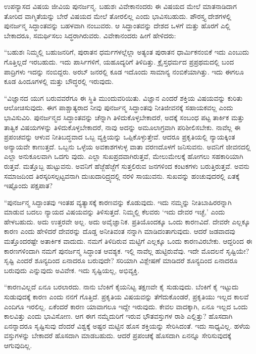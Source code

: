ಉಪನ್ಯಾಸದ ವಿಷಯ ಜೀವಿಯ ಪುನರ್ಜನ್ಮ. ಬಹುಶಃ ವಿವೇಕಾನಂದರು ಈ ವಿಷಯದ ಮೇಲೆ ಮಾತನಾಡಿದಾಗ ತೋರಿದ ವಾಗ್ಮಿತೆಯನ್ನು ಬೇರೆ ವಿಷಯದ ಮೇಲೆ ತೋರಲಿಲ್ಲ ಎಂದು ಭಾವಿಸಬಹುದು. ಪೌರಸ್ತ್ಯ ದೇಶಗಳಲ್ಲಿ ಪುನರ್ಜನ್ಮ ಸಿದ್ಧಾಂತವನ್ನು ಬಹಳವಾಗಿ ನಂಬುವರು. ಆ ಸಿದ್ಧಾಂತವನ್ನು ದೇಶದ ಒಳಗೆ ಮತ್ತು ಹೊರಗೆ ಎಲ್ಲಿ ಬೇಕಾದರೂ, ಸಮರ್ಥಿಸಲು ಸಿದ್ಧರಾಗಿರುವರು. ವಿವೇಕಾನಂದರು ಹೀಗೆ ಹೇಳಿದರು:

“ಬಹುಶಃ ನಿಮ್ಮಲ್ಲಿ ಬಹುಜನರಿಗೆ, ಪುರಾತನ ಧರ್ಮಗಳಲ್ಲೆಲ್ಲಾ ಅತ್ಯಂತ ಪುರಾತನ ಧಾರ್ಮಿಕನಂಬಿಕೆ ಇದು ಎಂಬುದು ಗೊತ್ತಿಲ್ಲದೆ ಇರಬಹುದು. ಇದು ಪಾರ್ಸಿಗಳಿಗೆ, ಯಹೂದ್ಯರಿಗೆ ತಿಳಿದಿತ್ತು. ಕ್ರೈಸ್ತಧರ್ಮದ ಪ್ರಪ್ರಥಮದಲ್ಲಿ ಬಂದ ಪಾದ್ರಿಗಳು ಇದನ್ನು ನಂಬಿದ್ದರು. ಅರಬ್​ ಜನರಲ್ಲಿ ಕೂಡ ಇದೊಂದು ಸಾಮಾನ್ಯ ನಂಬಿಕೆಯಾಗಿತ್ತು. ಇದು ಈಗಲೂ ಕೂಡ ಹಿಂದೂಗಳಲ್ಲಿ ಮತ್ತು ಬೌದ್ಧರಲ್ಲಿ ಇರುವುದು.

“ವಿಜ್ಞಾನದ ಯುಗ ಬರುವವರೆಗೂ ಈ ಸ್ಥಿತಿ ಮುಂದುವರಿಯಿತು. ವಿಜ್ಞಾನ ಎಂದರೆ ಶಕ್ತಿಯ ವಿಷಯವನ್ನು ಕುರಿತು ಆಲೋಚಿಸುವುದು. ಈಗ ಪಾಶ್ಚಾತ್ಯರಾದ ನೀವು ಪುನರ್ಜನ್ಮ ಸಿದ್ಧಾಂತವು ನೀತಿಜೀವನಕ್ಕೆ ಸಹಾಯಕವಲ್ಲ ಎಂದು ಭಾವಿಸುವಿರಿ. ಪುನರ್ಜನ್ಮದ ಸಿದ್ಧಾಂತವನ್ನು ಚೆನ್ನಾಗಿ ತಿಳಿದುಕೊಳ್ಳಬೇಕಾದರೆ, ಅದಕ್ಕೆ ಸಂಬಂಧ ಪಟ್ಟ ತಾರ್ಕಿಕ ಮತ್ತು ತಾತ್ವಿಕ ವಿಷಯಗಳನ್ನು ತಿಳಿದುಕೊಳ್ಳಬೇಕಾದರೆ, ನಾವು ಅದನ್ನು ಅಮೂಲಾಗ್ರವಾಗಿ ಪರಿಶೀಲಿಸಬೇಕು. ನಾವೆಲ್ಲ ಈ ಪ್ರಪಂಚವನ್ನು ಆಳುವ ನೀತಿಬದ್ಧವಾದ ಒಬ್ಬ ವ್ಯಕ್ತಿಯನ್ನು ಒಪ್ಪಿಕೊಳ್ಳುತ್ತೇವೆ. ಆದರೂ ಪ್ರಕೃತಿಯಲ್ಲಿ ನ್ಯಾಯಕ್ಕಿಂತ ಅನ್ಯಾಯವೇ ಕಾಣುತ್ತದೆ. ಒಬ್ಬನು ಒಳ್ಳೆಯ ಅವಕಾಶಗಳುಳ್ಳ ವಾತಾ ವರಣದೊಳಗೆ ಜನಿಸುವನು. ಅವನಿಗೆ ಜೀವನದಲ್ಲಿ ಎಲ್ಲಾ ಅನುಕೂಲವಾಗಿ ಒದಗು ವುದು. ಎಲ್ಲಾ ಸುಖಪ್ರದವಾಗಿರುತ್ತವೆ, ಮೇಲುಮೇಲಕ್ಕೆ ಹೋಗಲು ಸಹಕಾರಿಯಾಗಿ ರುತ್ತವೆ. ಮತ್ತೊಬ್ಬ ಹುಟ್ಟುವನು. ಅವನಿಗೆ ಹೆಜ್ಜೆಹೆಜ್ಜೆಗೆ ಸುತ್ತಲಿರುವ ಜನಗಳಿಂದ ಕಂಟಕಗಳು ಬರುತ್ತಿರುತ್ತವೆ. ಅವನು ಸಮಾಜದಿಂದ ತಿರಸ್ಕರಿಸಲ್ಪಟ್ಟವನಾಗಿ ದುಃಖದಾರಿದ್ರ್ಯದಲ್ಲಿ ನರಳಿ ಸಾಯುವನು. ಸುಖವನ್ನು ಹಂಚುವುದರಲ್ಲಿ ಏತಕ್ಕೆ ಇಷ್ಟೊಂದು ಪಕ್ಷಪಾತ?

“ಪುನರ್ಜನ್ಮ ಸಿದ್ದಾಂತವು ಇಂತಹ ವ್ಯತ್ಯಾಸಕ್ಕೆ ಕಾರಣವನ್ನು ಕೊಡುವುದು. ಇದು ನಮ್ಮನ್ನು ನೀತಿಬಾಹಿರರನ್ನಾಗಿ ಮಾಡುವ ಬದಲು ನ್ಯಾಯದ ವಿಷಯವನ್ನು ತಿಳಿಸುತ್ತದೆ. ನಿಮ್ಮಲ್ಲಿ ಕೆಲವರು ‘ಇದು ದೇವರ ಇಚ್ಛೆ,’ ಎಂದು ಹೇಳಬಹುದು. ಅದು ಉತ್ತರವೇ ಅಲ್ಲ. ಅದು ಅವೈಜ್ಞಾನಿಕ. ಪ್ರತಿಯೊಂದಕ್ಕೂ ಒಂದು ಕಾರಣವಿದೆ. ದೇವರೇ ಎಲ್ಲಕ್ಕೂ ಕಾರಣ ಎಂದು ಹೇಳಿದರೆ ದೇವರನ್ನು ದೊಡ್ಡ ಅನೀತಿವಂತ ನನ್ನಾಗಿ ಮಾಡಿದಂತಾಗುವುದು. ಆದರೆ ಜಡವಾದವು ಮತ್ತೊಂದರಷ್ಟೇ ಅತಾರ್ಕಿಕ ವಾದುದು. ನಮಗೆ ತಿಳಿದಿರುವ ಮಟ್ಟಿಗೆ ಎಲ್ಲಕ್ಕೂ ಒಂದು ಕಾರಣವಿರಬೇಕು. ಆದ್ದರಿಂದ ಈ ಕಾರಣಗಳಿಂದಾಗಿ ನಮಗೆ ಪುನರ್ಜನ್ಮ ಸಿದ್ಧಾಂತ ಆವಶ್ಯಕ. ಇಲ್ಲಿ ನಾವೆಲ್ಲ ಹುಟ್ಟಿರುವೆವು. ಇದೇ ಮೊದಲನೆ ಸೃಷ್ಟಿಯೇ? ಸೃಷ್ಟಿ ಎಂದರೆ ಶೂನ್ಯದಿಂದ ಏನಾದರೂ ಬರುವುದೇ? ಸರಿಯಾಗಿ ವಿಶ್ಲೇಷಣೆ ಮಾಡಿದರೆ ಶೂನ್ಯದಿಂದ ಏನಾದರೂ ಬರುವುದು ಎನ್ನುವುದು ಅವಿವೇಕ. ಇದು ಸೃಷ್ಟಿಯಲ್ಲ, ಅಭಿವ್ಯಕ್ತಿ.

“ಕಾರಣವಿಲ್ಲದೆ ಏನೂ ಬರಲಾರದು. ನಾನು ಬೆಂಕಿಗೆ ಕೈಯನಿಟ್ಟ ತಕ್ಷಣವೇ ಕೈ ಸುಡುವುದು. ಬೆಂಕಿಗೆ ಕೈ ಇಟ್ಟುದು ಸುಡುವುದಕ್ಕೆ ಕಾರಣ ಎಂದು ನನಗೆ ಗೊತ್ತಿದೆ. ಪ್ರಕೃತಿಯ ವಿಷಯವನ್ನು ತೆಗೆದುಕೊಂಡರೆ, ಪ್ರಕೃತಿಯು ಇಲ್ಲದ ಕಾಲವೆ ಎಂದಿಗೂ ಇರಲಿಲ್ಲ. ಏಕೆಂದರೆ ಕಾರಣ ಯಾವಾಗಲೂ ಇದ್ದೇ ಇರುವುದು. ಕೇವಲ ವಾದಕ್ಕಾಗಿ, ಏನೂ ಇಲ್ಲದ ಒಂದು ಕಾಲವಿತ್ತು ಎಂದು ಭಾವಿಸೋಣ. ಆಗ ಈಗ ನಮ್ಮೆದುರಿಗೆ ಇರುವ ಭೌತವಸ್ತುಗಳ ರಾಶಿ ಎಲ್ಲಿತ್ತು? ಹೊಸದಾಗಿ ಏನನ್ನಾದರೂ ಸೃಷ್ಟಿಸುವು ದೆಂದರೆ ವಿಶ್ವಕ್ಕೆ ಅಷ್ಟರ ಮಟ್ಟಿನ ಹೊಸ ಶಕ್ತಿಯನ್ನು ಸೇರಿಸಿದಂತೆ. ಇದು ಸಾಧ್ಯವಿಲ್ಲ. ಹಳೆಯ ವಸ್ತುಗಳನ್ನು ಬೇಕಾದರೆ ಹೊಸದಾಗಿ ಮಾಡಬಹುದು. ಆದರೆ ಪ್ರಪಂಚಕ್ಕೆ ಹೊಸದಾಗಿ ಏನನ್ನೂ ಸೇರಿಸುವುದಕ್ಕೆ ಆಗುವುದಿಲ್ಲ.

